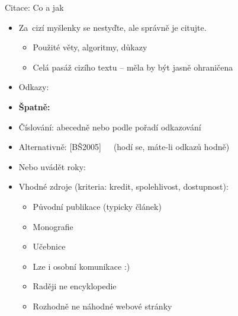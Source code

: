 \documentclass{beamer}
\begin{document}
\begin{frame}{Citace: Co a jak}

\begin{itemize}
\item Za~cizí myšlenky se nestyďte, ale správně je citujte.
   \begin{itemize}
   \item Použité věty, algoritmy, důkazy
   \item Celá pasáž cizího textu -- měla by být jasně ohraničena
   \end{itemize}
\item Odkazy: 
\item {\bf Špatně:} 
\item Číslování: abecedně nebo podle pořadí odkazování
\item Alternativně: [BŠ2005]~~~(hodí se, máte-li odkazů hodně)
\item Nebo uvádět roky: 
\end{itemize}

\begin{itemize}
\item Vhodné zdroje (kriteria: kredit, spolehlivost, dostupnost):
   \begin{itemize}
   \item Původní publikace (typicky článek)
   \item Monografie
   \item Učebnice
   \item Lze i osobní komunikace :)
   \item Raději ne encyklopedie
   \item Rozhodně ne náhodné webové stránky
   \end{itemize}
\end{itemize}

\end{frame}
\end{document}
